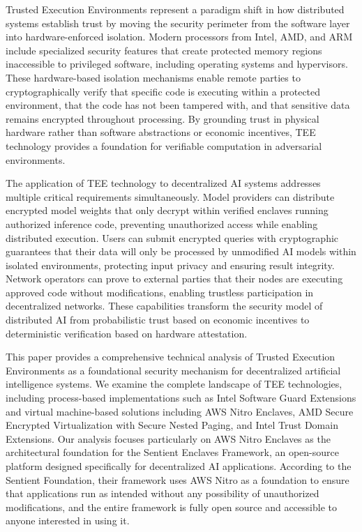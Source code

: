 Trusted Execution Environments represent a paradigm shift in how distributed systems establish trust by moving the security perimeter from the software layer into hardware-enforced isolation. Modern processors from Intel, AMD, and ARM include specialized security features that create protected memory regions inaccessible to privileged software, including operating systems and hypervisors. These hardware-based isolation mechanisms enable remote parties to cryptographically verify that specific code is executing within a protected environment, that the code has not been tampered with, and that sensitive data remains encrypted throughout processing. By grounding trust in physical hardware rather than software abstractions or economic incentives, TEE technology provides a foundation for verifiable computation in adversarial environments.

The application of TEE technology to decentralized AI systems addresses multiple critical requirements simultaneously. Model providers can distribute encrypted model weights that only decrypt within verified enclaves running authorized inference code, preventing unauthorized access while enabling distributed execution. Users can submit encrypted queries with cryptographic guarantees that their data will only be processed by unmodified AI models within isolated environments, protecting input privacy and ensuring result integrity. Network operators can prove to external parties that their nodes are executing approved code without modifications, enabling trustless participation in decentralized networks. These capabilities transform the security model of distributed AI from probabilistic trust based on economic incentives to deterministic verification based on hardware attestation.

This paper provides a comprehensive technical analysis of Trusted Execution Environments as a foundational security mechanism for decentralized artificial intelligence systems. We examine the complete landscape of TEE technologies, including process-based implementations such as Intel Software Guard Extensions and virtual machine-based solutions including AWS Nitro Enclaves, AMD Secure Encrypted Virtualization with Secure Nested Paging, and Intel Trust Domain Extensions. Our analysis focuses particularly on AWS Nitro Enclaves as the architectural foundation for the Sentient Enclaves Framework, an open-source platform designed specifically for decentralized AI applications. According to the Sentient Foundation, their framework uses AWS Nitro as a foundation to ensure that applications run as intended without any possibility of unauthorized modifications, and the entire framework is fully open source and accessible to anyone interested in using it.

